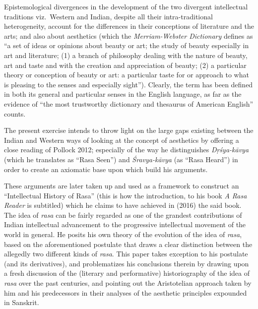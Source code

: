 Epistemological divergences in the development of the two divergent intellectual traditions viz.~Western and Indian, despite all their intra-traditional heterogeneity, account for the differences in their conceptions of literature and the arts; and also about aesthetics (which the \textsl{Merriam-Webster Dictionary} defines as “a set of ideas or opinions about beauty or art; the study of beauty especially in art and literature; (1) a branch of philosophy dealing with the nature of beauty, art and taste and with the creation and appreciation of beauty; (2) a particular theory or conception of beauty or art: a particular taste for or approach to what is pleasing to the senses and especially sight”). Clearly, the term has been defined in both its general and particular senses in the English language, as far as the evidence of “the most trustworthy dictionary and thesaurus of American English” counts. 

The present exercise intends to throw light on the large gaps existing between the Indian and Western ways of looking at the concept of aesthetics by offering a close reading of Pollock 2012; especially of the way he distinguishes \textsl{Dṛśya-kāvya} (which he translates as “Rasa Seen”) and \textsl{Śravya-kāvya} (as “Rasa Heard”) in order to create an axiomatic base upon which build his arguments. 

These arguments are later taken up and used as a framework to construct an “Intellectual History of Rasa” (this is how the introduction, to his book \textsl{A Rasa Reader} is subtitled) which he claims to have achieved in (2016) the said book. The idea of \textsl{rasa} can be fairly regarded as one of the grandest contributions of Indian intellectual advancement to the progressive intellectual movement of the world in general. He posits his own theory of the evolution of the idea of \textsl{rasa}, based on the aforementioned postulate that draws a clear distinction between the allegedly two different kinds of \textsl{rasa}. This paper takes exception to his postulate (and its derivatives), and problematizes his conclusions therein by drawing upon a fresh discussion of the (literary and performative) historiography of the idea of \textsl{rasa} over the past centuries, and pointing out the Aristotelian approach taken by him and his predecessors in their analyses of the aesthetic principles expounded in Sanskrit.

